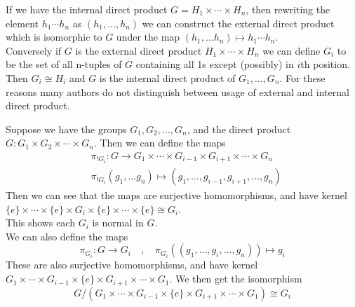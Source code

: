 \begin{remark}

If we have the internal direct product $G = H_1 \times \cdots \times H_n$, then rewriting the element $h_1 \cdots h_n$ as $(h_1, \ldots, h_n )$ we can construct the external direct product which is isomorphic to $G$ under the map $(h_1, \ldots h_n ) \mapsto h_1 \cdots h_n$.
\\
Conversely if $G$ is the external direct product $H_1 \times \cdots \times H_n$ we can define $G_i$ to be the set of all n-tuples of $G$ containing all 1s except (possibly) in $i$th position. Then $G_i \cong H_i$ and $G$ is the internal direct product of $G_1, \ldots , G_n$. 
For these reasons many authors do not distinguish between usage of external and internal direct product.
\end{remark}

\begin{remark}\label{rem:normalDirectProd}
Suppose we have the groups $G_1, G_2, \ldots,  G_n$, and the direct product $G : G_1 \times G_2 \times \cdots \times G_n$. Then we can define the maps 
\begin{eqnarray*}
& \pi_{!G_i} : G \rightarrow G_1 \times \cdots \times G_{i-1} \times  G_{i+1} \times \cdots \times G_n \\
& \pi_{!G_i}(g_1,\ldots g_n) \mapsto (g_1,\ldots, g_{i-1}, g_{i+1},\ldots,g_n)
\end{eqnarray*}
Then we can see that the maps are surjective homomorphisms, and have kernel $\{e\} \times \cdots \times \{e\} \times G_i \times \{e\} \times \cdots \times \{e\} \cong G_i$. \\
This shows each $G_i$ is normal in $G$. 
\\
We can also define the maps $$\pi_{G_i} : G \rightarrow G_i \quad , \quad  \pi_{G_i}((g_1,\ldots, g_i,\ldots,g_n)) \mapsto g_i$$
These are also surjective homomorphisms, and have kernel $G_1 \times \cdots \times G_{i-1} \times \{e\} \times G_{i+1} \times \cdots \times G_1$. We then get the isomorphism 
$$G / (G_1 \times \cdots \times G_{i-1} \times \{e\} \times G_{i+1} \times \cdots \times G_1) \cong G_i$$
\end{remark}


